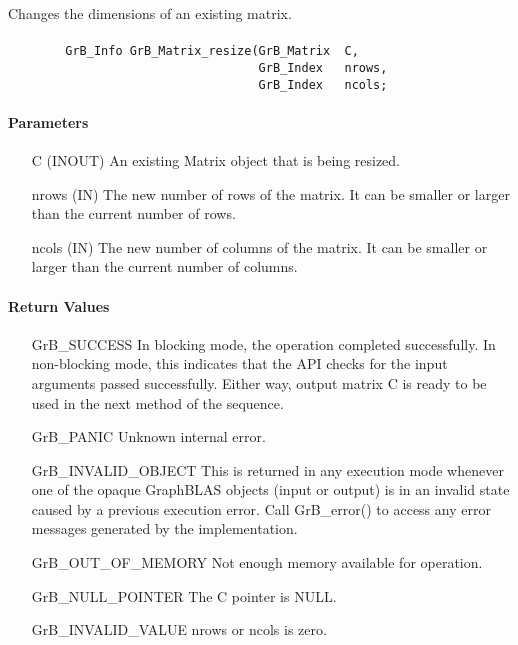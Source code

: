 Changes the dimensions of an existing matrix.

\paragraph{\syntax}

\begin{verbatim}
        GrB_Info GrB_Matrix_resize(GrB_Matrix  C,
                                   GrB_Index   nrows,
                                   GrB_Index   ncols;
\end{verbatim}

\paragraph{Parameters}

\begin{itemize}[leftmargin=1.1in]
    \item[{\sf C}] ({\sf INOUT}) An existing Matrix object that is being resized.
    \item[{\sf nrows}] ({\sf IN}) The new number of rows of the matrix. It can be smaller or larger than the current number of rows.
    \item[{\sf ncols}] ({\sf IN}) The new number of columns of the matrix. It can be smaller or larger than the current number of columns.
\end{itemize}

\paragraph{Return Values}

\begin{itemize}[leftmargin=2.1in]
    \item[{\sf GrB\_SUCCESS}]         In blocking mode, the operation completed
    successfully. In non-blocking mode, this indicates that the API checks 
    for the input arguments passed successfully. Either way, output matrix 
    {\sf C} is ready to be used in the next method of the sequence.

    \item[{\sf GrB\_PANIC}]           Unknown internal error.
    
    \item[{\sf GrB\_INVALID\_OBJECT}] This is returned in any execution mode 
    whenever one of the opaque GraphBLAS objects (input or output) is in an invalid 
    state caused by a previous execution error.  Call {\sf GrB\_error()} to access 
    any error messages generated by the implementation.

    \item[{\sf GrB\_OUT\_OF\_MEMORY}] Not enough memory available for operation.
    
    \item[{\sf GrB\_NULL\_POINTER}]  The {\sf C} pointer is {\sf NULL}.
    
    \item[{\sf GrB\_INVALID\_VALUE}] {\sf nrows} or {\sf ncols} is zero.
\end{itemize}

